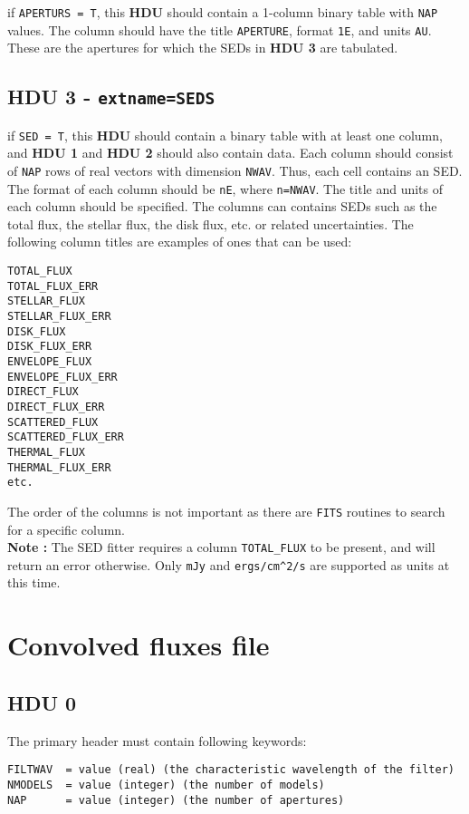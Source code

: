 \documentclass[11pt]{article}
\begin{document}
if \texttt{APERTURS = T}, this \textbf{HDU} should contain a 1-column binary table with \texttt{NAP}
values. The column should have the title \texttt{APERTURE}, format \texttt{1E}, and units \texttt{AU}. These are the apertures for which the SEDs in \textbf{HDU 3} are tabulated.

\subsection{HDU 3 - \texttt{extname=SEDS}}

if \texttt{SED = T}, this \textbf{HDU} should contain a binary table with at least one column, and \textbf{HDU 1} and  \textbf{HDU 2}  should also contain data. Each column should consist of \texttt{NAP} rows of real vectors with dimension \texttt{NWAV}. Thus, each cell contains an SED. The format of each column should be \texttt{nE}, where \texttt{n=NWAV}. The title and units of each column should be specified. The columns can contains SEDs such as the total flux, the stellar flux, the disk flux, etc. or related uncertainties. The following column titles are examples of ones that can be used:

\begin{verbatim}
TOTAL_FLUX
TOTAL_FLUX_ERR
STELLAR_FLUX
STELLAR_FLUX_ERR
DISK_FLUX
DISK_FLUX_ERR
ENVELOPE_FLUX
ENVELOPE_FLUX_ERR
DIRECT_FLUX
DIRECT_FLUX_ERR
SCATTERED_FLUX
SCATTERED_FLUX_ERR
THERMAL_FLUX
THERMAL_FLUX_ERR
etc.
\end{verbatim}

The order of the columns is not important as there are \texttt{FITS} routines to search for a specific column.\\

\textbf{Note : } The SED fitter requires a column \texttt{TOTAL\_FLUX} to be present, and will return an error otherwise. Only \texttt{mJy} and \texttt{ergs/cm\^{}2/s} are supported as units at this time.

\section{Convolved fluxes file}

\subsection{HDU 0}

The primary header must contain following keywords:

\begin{verbatim}
FILTWAV  = value (real) (the characteristic wavelength of the filter)
NMODELS  = value (integer) (the number of models)
NAP      = value (integer) (the number of apertures)
\end{verbatim}
\end{document}
